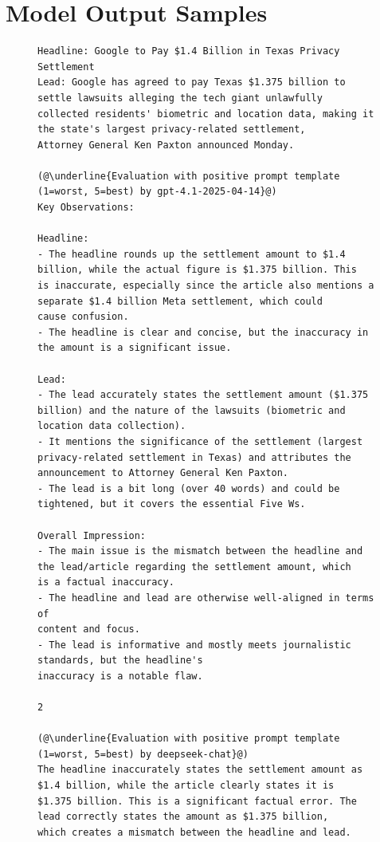 \documentclass[UTF8,noindent,nohyp,parspace,titlepage,twoside,12pt]{article}
\begin{document}
\clearpage

  \section{Model Output Samples}

    \begin{figure}[!hbtp]
      \begin{lstlisting}[basicstyle=\tiny\sffamily,frame=single,linewidth=\textwidth]
Headline: Google to Pay $1.4 Billion in Texas Privacy Settlement
Lead: Google has agreed to pay Texas $1.375 billion to settle lawsuits alleging the tech giant unlawfully
collected residents' biometric and location data, making it the state's largest privacy-related settlement,
Attorney General Ken Paxton announced Monday.

(@\underline{Evaluation with positive prompt template (1=worst, 5=best) by gpt-4.1-2025-04-14}@)
Key Observations:

Headline:
- The headline rounds up the settlement amount to $1.4 billion, while the actual figure is $1.375 billion. This
is inaccurate, especially since the article also mentions a separate $1.4 billion Meta settlement, which could
cause confusion.
- The headline is clear and concise, but the inaccuracy in the amount is a significant issue.

Lead:
- The lead accurately states the settlement amount ($1.375 billion) and the nature of the lawsuits (biometric and
location data collection).
- It mentions the significance of the settlement (largest privacy-related settlement in Texas) and attributes the
announcement to Attorney General Ken Paxton.
- The lead is a bit long (over 40 words) and could be tightened, but it covers the essential Five Ws.

Overall Impression:
- The main issue is the mismatch between the headline and the lead/article regarding the settlement amount, which
is a factual inaccuracy.
- The headline and lead are otherwise well-aligned in terms of
content and focus.
- The lead is informative and mostly meets journalistic standards, but the headline's
inaccuracy is a notable flaw.

2

(@\underline{Evaluation with positive prompt template (1=worst, 5=best) by deepseek-chat}@)
The headline inaccurately states the settlement amount as $1.4 billion, while the article clearly states it is
$1.375 billion. This is a significant factual error. The lead correctly states the amount as $1.375 billion,
which creates a mismatch between the headline and lead.


\end{lstlisting}
\end{figure}
\end{document}
